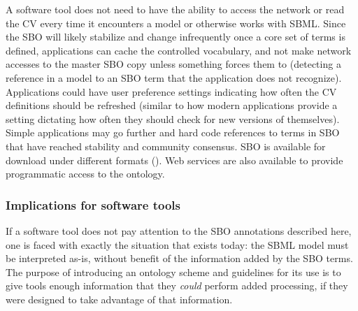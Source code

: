 A software tool does not need to have the ability to access the
network or read the CV every time it encounters a model or
otherwise works with SBML.  Since the SBO will likely stabilize
and change infrequently once a core set of terms is defined,
applications can cache the controlled vocabulary, and not make
network accesses to the master SBO copy unless something forces
them to (\eg detecting a reference in a model to an SBO term that
the application does not recognize).  Applications could have user
preference settings indicating how often the CV definitions should
be refreshed (similar to how modern applications provide a setting
dictating how often they should check for new versions of
themselves).  Simple applications may go further and hard code
references to terms in SBO that have reached stability and
community consensus. SBO is available for download under different
formats (\sboref).  Web services are also available to provide
programmatic access to the ontology.


\subsubsection{Implications for software tools}

If a software tool does not pay attention to the SBO
annotations described here, one is faced with exactly the
situation that exists today: the SBML model must be interpreted
as-is, without benefit of the information added by the SBO terms.
The purpose of introducing an ontology scheme and guidelines for
its use is to give tools enough information that they \emph{could}
perform added processing, if they were designed to take advantage
of that information.
% 
% 
% 
